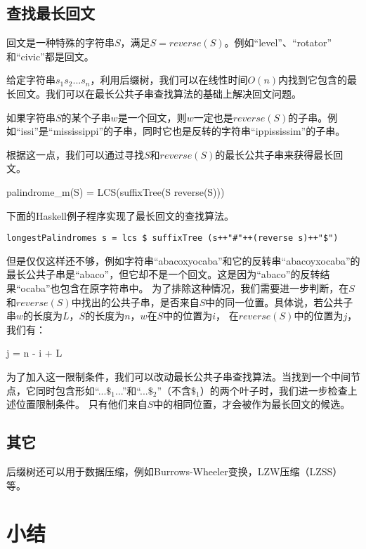 \documentclass{ctexart}
\begin{document}
\subsection{查找最长回文}

回文是一种特殊的字符串$S$，满足$S=reverse(S)$。例如“level”、“rotator”
和“civic”都是回文。

给定字符串$s_1s_2...s_n$，利用后缀树，我们可以在线性时间$O(n)$内找到它包含的最长回文。我们可以在最长公共子串查找算法的基础上解决回文问题。

如果字符串$S$的某个子串$w$是一个回文，则$w$一定也是$reverse(S)$的子串。例如“issi”是“mississippi”的子串，同时它也是反转的字符串“ippississim”的子串。

根据这一点，我们可以通过寻找$S$和$reverse(S)$的最长公共子串来获得最长回文。

\be
palindrome_m(S) = LCS(suffixTree(S \cup reverse(S)))
\ee

下面的Haskell例子程序实现了最长回文的查找算法。

\lstset{language=Haskell}
\begin{lstlisting}[style=Haskell]
longestPalindromes s = lcs $ suffixTree (s++"#"++(reverse s)++"$")
\end{lstlisting}

但是仅仅这样还不够，例如字符串“abacoxyocaba”和它的反转串“abacoyxocaba”的最长公共子串是“abaco”，但它却不是一个回文。这是因为“abaco”的反转结果“ocaba”也包含在原字符串中。
为了排除这种情况，我们需要进一步判断，在$S$和$reverse(S)$中找出的公共子串，是否来自$S$中的同一位置。具体说，若公共子串$w$的长度为$L$，$S$的长度为$n$，$w$在$S$中的位置为$i$，
在$reverse(S)$中的位置为$j$，我们有：

\be
j = n - i + L
\ee

为了加入这一限制条件，我们可以改动最长公共子串查找算法。当找到一个中间节点，它同时包含形如“...$\$_1$...”和“...$\$_2$”（不含$\$_1$）的两个叶子时，我们进一步检查上述位置限制条件。
只有他们来自$S$中的相同位置，才会被作为最长回文的候选。

\subsection{其它}
后缀树还可以用于数据压缩，例如Burrows-Wheeler变换，LZW压缩（LZSS）等\cite{wiki-suffix-tree}。

\section{小结}
\end{document}

